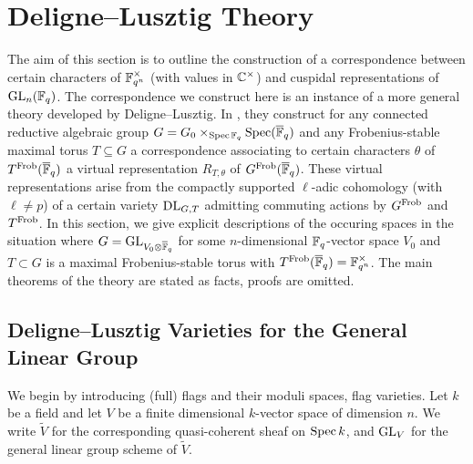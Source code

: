 \documentclass[../main.tex]{subfiles}
\begin{document}
\section{Deligne--Lusztig Theory} 
\label{sub:Deligne-Lusztig Theory for Depth Zero Representations}
The aim of this section is to outline the construction of a correspondence
between certain characters of $\mathbb{F}_{q^n}^\times$ (with values in $\mathbb{C}^\times$) and 
cuspidal representations of $\operatorname{GL}_n(\mathbb{F}_q)$. The correspondence we construct here
is an instance of a more general theory developed by Deligne--Lusztig. 
In \cite{delignelusztig1976}, they construct
for any connected reductive algebraic group $G = G_0 \times_{\operatorname{Spec} \mathbb{F}_q}
\operatorname{Spec}(\overline {\mathbb{F}}_q)$ and any
Frobenius-stable maximal torus $T \subseteq G$ a correspondence associating to
certain characters $\theta$ of $T^{\mathrm{Frob}}({\overline {\mathbb{F}}_q})$ a virtual representation $R_{T,\theta}$ of 
$G^{\mathrm{Frob}}({\overline {\mathbb{F}}_q})$. These virtual representations arise from the compactly supported
$\ell$-adic cohomology (with $\ell \neq p$) of a certain variety $\mathrm{DL}_{G,T}$
admitting commuting actions by $G^{\mathrm{Frob}}$ and $T^{\mathrm{Frob}}$. 
In this section, we give explicit descriptions of the occuring spaces 
in the situation where $G = \operatorname{GL}_{V_0 \otimes \overline {\mathbb{F}}_q}$ for some
$n$-dimensional $\mathbb{F}_q$-vector space $V_0$ and $T \subset G$ is a maximal 
Frobenius-stable torus with $T^{\mathrm{Frob}}(\overline {\mathbb{F}}_q) = \mathbb{F}_{q^n}^\times$.
The main theorems of the theory are stated as facts, proofs are omitted.

\subsection{Deligne--Lusztig Varieties for the General Linear Group} %
\label{ssub:Deligne--Lusztig Varieties}
We begin by introducing (full) flags and their moduli spaces, flag
varieties. Let $k$ be a field and let $V$ be a finite dimensional $k$-vector space
of dimension $n$. We write $\tilde V$ for the corresponding quasi-coherent sheaf
on $\operatorname{Spec} k$, and $\operatorname{GL}_V$ for the general linear group scheme of $\tilde V$.
\end{document}
